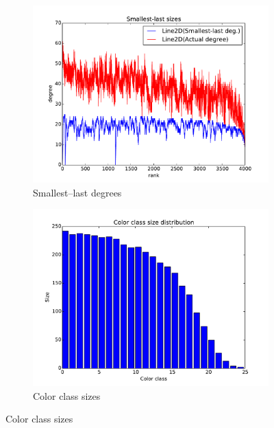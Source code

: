\documentclass[oneside, titlepage]{scrartcl}
\begin{document}
\begin{figure}[!h]
\begin{subfigure}{0.5\textwidth}
	\centering
	\includegraphics[width=0.9\linewidth]{figures/ordering2.pdf}
	\caption{Smallest--last degrees}
\end{subfigure}%
\begin{subfigure}{0.5\textwidth}
	\centering
	\includegraphics[width=0.9\linewidth]{figures/colors2.pdf}
	\caption{Color class sizes}
\end{subfigure}


\end{figure}
\end{document}
